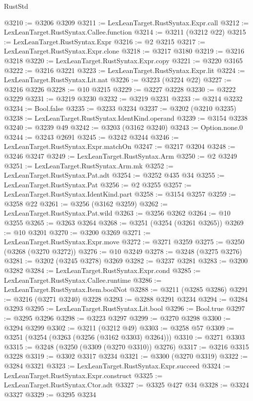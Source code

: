 \begin{lexlean}{RustStd}
\begin{coremodule}
@3210 := @3206 @3209
@3211 := LexLeanTarget.RustSyntax.Expr.call
@3212 := LexLeanTarget.RustSyntax.Callee.function
@3214 := @3211 (@3212 @22)
@3215 := LexLeanTarget.RustSyntax.Expr
@3216 := @2 @3215
@3217 := LexLeanTarget.RustSyntax.Expr.clone
@3218 := @3217 @3180
@3219 := @3216 @3218
@3220 := LexLeanTarget.RustSyntax.Expr.copy
@3221 := @3220 @3165
@3222 := @3216 @3221
@3223 := LexLeanTarget.RustSyntax.Expr.lit
@3224 := LexLeanTarget.RustSyntax.Lit.nat
@3226 := @3223 (@3224 @22)
@3227 := @3216 @3226
@3228 := @10 @3215
@3229 := @3227 @3228
@3230 := @3222 @3229
@3231 := @3219 @3230
@3232 := @3219 @3231
@3233 := @3214 @3232
@3234 := Bool.false
@3235 := @3233 @3234
@3237 := @3202 (@3210 @3235)
@3238 := LexLeanTarget.RustSyntax.IdentKind.operand
@3239 := @3154 @3238
@3240 := @3239 @49
@3242 := @3203 (@3162 @3240)
@3243 := Option.none.{0}
@3244 := @3243 @2691
@3245 := @3242 @3244
@3246 := LexLeanTarget.RustSyntax.Expr.matchOn
@3247 := @3217 @3204
@3248 := @3246 @3247
@3249 := LexLeanTarget.RustSyntax.Arm
@3250 := @2 @3249
@3251 := LexLeanTarget.RustSyntax.Arm.mk
@3252 := LexLeanTarget.RustSyntax.Pat.adt
@3254 := @3252 @435 @34
@3255 := LexLeanTarget.RustSyntax.Pat
@3256 := @2 @3255
@3257 := LexLeanTarget.RustSyntax.IdentKind.part
@3258 := @3154 @3257
@3259 := @3258 @22
@3261 := @3256 (@3162 @3259)
@3262 := LexLeanTarget.RustSyntax.Pat.wild
@3263 := @3256 @3262
@3264 := @10 @3255
@3265 := @3263 @3264
@3268 := @3251 (@3254 (@3261 @3265))
@3269 := @10 @3201
@3270 := @3200 @3269
@3271 := LexLeanTarget.RustSyntax.Expr.move
@3272 := @3271 @3259
@3275 := @3250 (@3268 (@3270 @3272))
@3276 := @10 @3249
@3278 := @3248 (@3275 @3276)
@3281 := @3202 (@3245 @3278) @3269
@3282 := @3237 @3281
@3283 := @3200 @3282
@3284 := LexLeanTarget.RustSyntax.Expr.cond
@3285 := LexLeanTarget.RustSyntax.Callee.runtime
@3286 := LexLeanTarget.RustSyntax.Item.boolNot
@3288 := @3211 (@3285 @3286)
@3291 := @3216 (@3271 @3240) @3228
@3293 := @3288 @3291 @3234
@3294 := @3284 @3293
@3295 := LexLeanTarget.RustSyntax.Lit.bool
@3296 := Bool.true
@3297 := @3295 @3296
@3298 := @3223 @3297
@3299 := @3270 @3298
@3300 := @3294 @3299
@3302 := @3211 (@3212 @49)
@3303 := @3258 @57
@3309 := @3251 (@3254 (@3263 (@3256 (@3162 @3303) @3264)))
@3310 := @3271 @3303
@3315 := @3248 (@3250 (@3309 (@3270 @3310)) @3276)
@3317 := @3216 @3315 @3228
@3319 := @3302 @3317 @3234
@3321 := @3300 (@3270 @3319)
@3322 := @3284 @3321
@3323 := LexLeanTarget.RustSyntax.Expr.succeed
@3324 := LexLeanTarget.RustSyntax.Expr.construct
@3325 := LexLeanTarget.RustSyntax.Ctor.adt
@3327 := @3325 @427 @34
@3328 := @3324 @3327
@3329 := @3295 @3234

\end{coremodule}
\end{lexlean}
